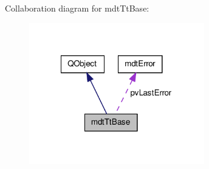 Collaboration diagram for mdt\-Tt\-Base\-:\nopagebreak
\begin{figure}[H]
\begin{center}
\leavevmode
\includegraphics[width=216pt]{classmdt_tt_base__coll__graph}
\end{center}
\end{figure}
